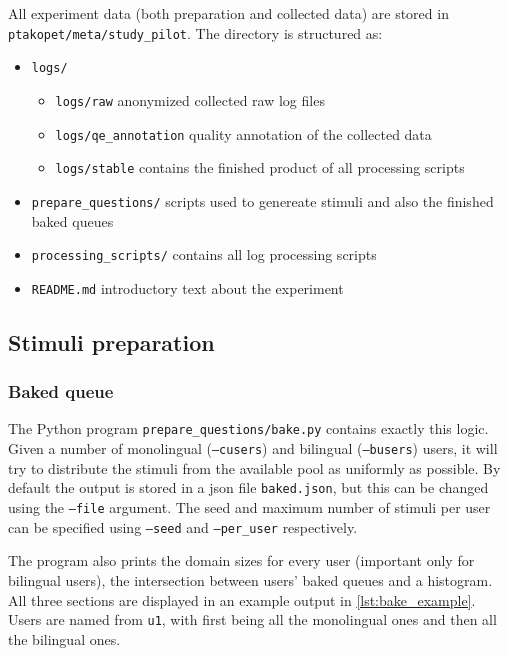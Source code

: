 All experiment data (both preparation and collected data) are stored in \texttt{ptakopet/meta/study\_pilot}. The directory is structured as:

\begin{itemize}
    \item \texttt{logs/}
    \begin{itemize}
        \item \texttt{logs/raw} anonymized collected raw log files
        \item \texttt{logs/qe\_annotation} quality annotation of the collected data
        \item \texttt{logs/stable} contains the finished product of all processing scripts
    \end{itemize}
    \item \texttt{prepare\_questions/} scripts used to genereate stimuli and also the finished baked queues
    \item \texttt{processing\_scripts/} contains all log processing scripts
    \item \texttt{README.md} introductory text about the experiment
\end{itemize}

\subsection{Stimuli preparation} \label{sec:dev_doc:prepare_stimuli}

\subsubsection{Baked queue} \label{subsubsec:dev_doc:baked_queue}

The Python program \texttt{prepare\_questions/bake.py} contains exactly this logic. Given a number of monolingual (\texttt{--cusers}) and bilingual (\texttt{--busers}) users, it will try to distribute the stimuli from the available pool as uniformly as possible. By default the output is stored in a json file \texttt{baked.json}, but this can be changed using the \texttt{--file} argument. The seed and maximum number of stimuli per user can be specified using \texttt{--seed} and \texttt{--per\_user} respectively.

The program also prints the domain sizes for every user (important only for bilingual users), the intersection between users' baked queues and a histogram. All three sections are displayed in an example output in \cref{lst:bake_example}. Users are named from \texttt{u1}, with first being all the monolingual ones and then all the bilingual ones.


